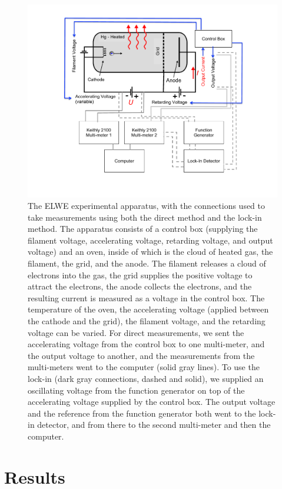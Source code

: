 \documentclass[prb,preprint]{revtex4-1}
\begin{document}
\begin{figure}[h!]
\centering
\includegraphics[width=5in]{set-up.pdf}
\caption{The ELWE experimental apparatus, with the connections used to take measurements using both the direct method and the lock-in method. The apparatus consists of a control box (supplying the filament voltage, accelerating voltage, retarding voltage, and output voltage) and an oven, inside of which is the cloud of heated gas, the filament, the grid, and the anode. The filament releases a cloud of electrons into the gas, the grid supplies the positive voltage to attract the electrons, the anode collects the electrons, and the resulting current is measured as a voltage in the control box. The temperature of the oven, the accelerating voltage (applied between the cathode and the grid), the filament voltage, and the retarding voltage can be varied. For direct measurements, we sent the accelerating voltage from the control box to one multi-meter, and the output voltage to another, and the measurements from the multi-meters went to the computer (solid gray lines).  To use the lock-in (dark gray connections, dashed and solid), we supplied an oscillating voltage from the function generator on top of the accelerating voltage supplied by the control box. The output voltage and the reference from the function generator both went to the lock-in detector, and from there to the second multi-meter and then the computer. }
\label{set-up}
\end{figure}

\section{Results}
\end{document}
